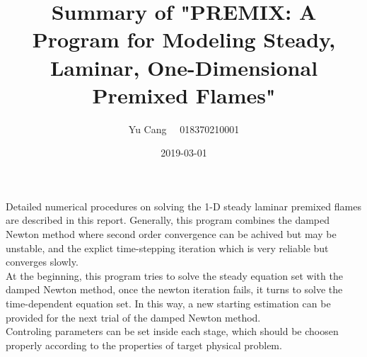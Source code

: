 \documentclass[paper=a4, fontsize=11pt]{scrartcl}
\title{Summary of "PREMIX: A Program for Modeling Steady, Laminar, One-Dimensional Premixed Flames"}
\author{Yu Cang \ \ 018370210001}
\date{2019-03-01}
\begin{document}
\maketitle

Detailed numerical procedures on solving the 1-D steady laminar premixed flames are described in this report. Generally, this program combines the damped Newton method where second order convergence can be achived but may be unstable, and the explict time-stepping iteration which is very reliable but converges slowly.\\
At the beginning, this program tries to solve the steady equation set with the damped Newton method, once the newton iteration fails, it turns to solve the time-dependent equation set. In this way,  a new starting estimation can be provided for the next trial of the damped Newton method. \\
Controling parameters can be set inside each stage, which should be choosen properly according to the properties of target physical problem.

	
\end{document}
